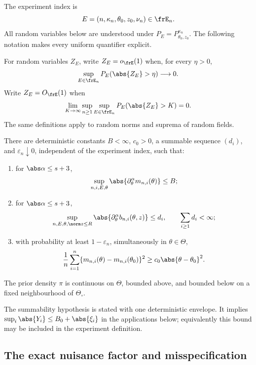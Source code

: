 The experiment index is
\[
 E=(n,\kappa_n,\theta_0,z_0,\nu_n)\in\frE_n.
\]
All random variables below are understood under
\(P_E=P_{\theta_0,z_0}^{\kappa_n}\).  The following notation makes every
uniform quantifier explicit.

\begin{definition}
\label{def:uniform-orders}
For random variables \(Z_E\), write \(Z_E=o_{\frE}(1)\) when, for every
\(\eta>0\),
\[
 \sup_{E\in\frE_n}P_E(\abs{Z_E}>\eta)\longrightarrow0.
\]
Write \(Z_E=O_{\frE}(1)\) when
\[
 \lim_{K\to\infty}\sup_{n\ge1}\sup_{E\in\frE_n}
 P_E(\abs{Z_E}>K)=0.
\]
The same definitions apply to random norms and suprema of random fields.
\end{definition}

\begin{assumption}
\label{ass:triangular}
There are deterministic constants \(B<\infty\), \(c_0>0\), a summable
sequence \((d_i)\), and \(\varepsilon_n\downarrow0\), independent of the
experiment index, such that:
\begin{enumerate}
\item for \(\abs\alpha\le s+3\),
\[
 \sup_{n,i,E,\theta}\abs{\partial_\theta^\alpha m_{n,i}(\theta)}\le B;
\]
\item for \(\abs\alpha\le s+3\),
\[
 \sup_{n,E,\theta,\norm z\le R}
 \abs{\partial_\theta^\alpha b_{n,i}(\theta,z)}\le d_i,
 \qquad \sum_{i\ge1}d_i<\infty;
\]
\item with probability at least \(1-\varepsilon_n\), simultaneously in
\(\theta\in\Theta\),
\begin{equation}
 \frac1n\sum_{i=1}^n
 \{m_{n,i}(\theta)-m_{n,i}(\theta_0)\}^2
 \ge c_0\abs{\theta-\theta_0}^2.
 \label{eq:abstract-contrast}
\end{equation}
\end{enumerate}
The prior density \(\pi\) is continuous on \(\Theta\), bounded above, and
bounded below on a fixed neighbourhood of \(\Theta_\circ\).
\end{assumption}

The summability hypothesis is stated with one deterministic envelope.  It
implies \(\sup_i\abs{Y_i}\le B_0+\abs{\xi_i}\) in the applications below;
equivalently this bound may be included in the experiment definition.

\subsection{The exact nuisance factor and misspecification}


